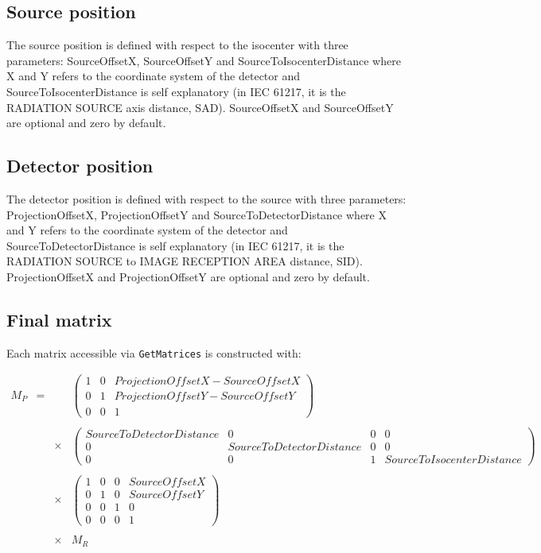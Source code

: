 \documentclass{article}
\begin{document}
\subsection{Source position}

The source position is defined with respect to the isocenter with three parameters: SourceOffsetX, SourceOffsetY and SourceToIsocenterDistance where X and Y refers to the coordinate system of the detector and SourceToIsocenterDistance is self explanatory (in IEC 61217, it is the RADIATION SOURCE axis distance, SAD). SourceOffsetX and SourceOffsetY are optional and zero by default.

\subsection{Detector position}

The detector position is defined with respect to the source with three parameters: ProjectionOffsetX, ProjectionOffsetY and SourceToDetectorDistance where X and Y refers to the coordinate system of the detector and SourceToDetectorDistance is self explanatory (in IEC 61217, it is the RADIATION SOURCE to IMAGE RECEPTION AREA distance, SID). ProjectionOffsetX and ProjectionOffsetY are optional and zero by default.

\subsection{Final matrix}

Each matrix accessible via \verb+GetMatrices+ is constructed with:

$$
\begin{array}{lcll}
  M_P & = & & %
  \begin{pmatrix}
    1 & 0 & ProjectionOffsetX-SourceOffsetX  \\
    0 & 1 & ProjectionOffsetY-SourceOffsetY  \\
    0 & 0 & 1
  \end{pmatrix} %
  \\ \\ & & \times & %
  \begin{pmatrix}
    SourceToDetectorDistance & 0 & 0 & 0  \\
    0 & SourceToDetectorDistance & 0 & 0  \\
    0 & 0 & 1 & SourceToIsocenterDistance
  \end{pmatrix} %
  \\ \\ & & \times & %
  \begin{pmatrix}
    1 & 0 & 0 & SourceOffsetX  \\
    0 & 1 & 0 & SourceOffsetY  \\
    0 & 0 & 1 & 0 \\
    0 & 0 & 0 & 1
  \end{pmatrix} %
  \\ \\ & & \times & %
  M_R
\end{array}
$$
\end{document}
